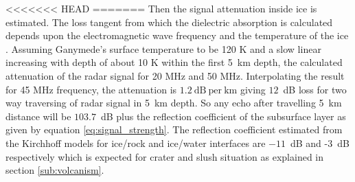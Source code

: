 <<<<<<< HEAD
=======
Then the signal attenuation inside ice is estimated. The loss tangent from which the dielectric absorption is calculated depends upon the electromagnetic wave frequency and the temperature of the ice \cite{MIMOSA}. Assuming Ganymede's surface temperature to be 120 K and a slow linear increasing with depth of about 10 K within the first 5~km depth\cite{Gany_SRS}, the calculated attenuation of the radar signal for 20 MHz and 50 MHz. Interpolating the result for 45 MHz frequency, the attenuation is $1.2 \mathrm{~dB~per~km}$ giving $12$~dB loss for two way traversing of radar signal in 5~km depth. So any echo after travelling 5~km distance will be $103.7$~dB plus the reflection coefficient of the subsurface layer as given by equation \ref{eq:signal_strength}. The reflection coefficient estimated from the Kirchhoff models for ice/rock and ice/water interfaces are $-11$~dB and -3~dB respectively which is expected for  crater and slush situation as explained in section \ref{sub:volcanism}.


